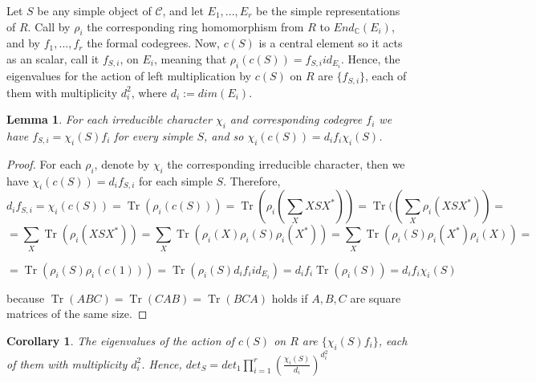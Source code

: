 \documentclass[a4paper,twoside,11pt]{amsart}
\newtheorem{lemma}[theorem]{Lemma}
\newtheorem{corollary}[theorem]{Corollary}
\theoremstyle{plain} %
\theoremstyle{definition}
\begin{document}
Let $S$ be any simple object of $\mathcal{C}$, and let $E_1,...,E_r$ be the simple representations of $R$. Call by $\rho_i$ the corresponding ring homomorphism from $R$ to  $End_{\mathbb{C}}(E_i)$, and by $f_1,...,f_r$ the formal codegrees. Now, $c(S)$ is a central element so it acts as an scalar, call it $f_{S,i}$, on $E_i$, meaning that $\rho_i (c(S))=f_{S,i} id_{E_i}$. Hence, the eigenvalues for the action of left multiplication by $c(S)$ on $R$ are  $\{f_{S,i}\}$, each of them with multiplicity $d_{i}^{2}$, where $d_i:=dim(E_i)$.
\\
\begin{lemma}
    For each irreducible character $\chi_i$ and corresponding codegree $f_i$ we have $f_{S,i}= \chi_i (S) f_i$ for every simple $S$, and so  $\chi_i(c(S))=d_i f_i  \chi_i (S)$.
\end{lemma}
\begin{proof}
    

For each $\rho_i$, denote by $\chi_i$ the corresponding irreducible character, then we have $\chi_i (c(S))=d_i f_{S,i}$ for each simple $S$. Therefore,
\begin{equation}
	d_i f_{S,i}=\chi_i (c(S))=\operatorname{Tr}(\rho_i (c(S)))=\operatorname{Tr}(\rho_i (\sum_X XSX^{*}))=\operatorname{Tr}((\sum_X \rho_i (XSX^{*}))=
\end{equation}
\begin{equation*}
	=\sum_X \operatorname{Tr}(\rho_i (XSX^{*}))=\sum_X \operatorname{Tr}(\rho_i (X)\rho_i(S)\rho_i(X^{*}))=\sum_X \operatorname{Tr}(\rho_i (S)\rho_i(X^{*})\rho_i(X))=
\end{equation*}

\begin{equation*}
	=\operatorname{Tr}(\rho_i (S)\rho_i(c(1)))=\operatorname{Tr}(\rho_i (S)d_i f_i id_{E_i})=d_i f_i \operatorname{Tr}(\rho_i (S))= d_i f_i  \chi_i (S)
\end{equation*}
\medskip

 because $\operatorname{Tr}(ABC)=\operatorname{Tr}(CAB)=\operatorname{Tr}(BCA)$ holds if $A,B,C$ are square matrices of the same size.
 \end{proof}
 
 \medskip 
 
  
 
\begin{corollary}
 	The eigenvalues of the action of $c(S)$ on $R$ are $\{\chi_i (S) f_i\}$, each of them with multiplicity $d_{i}^{2}$. Hence, $det_S=det_1 \prod\limits_{i=1}^{r}
	\left(
	\frac{\chi_i(S)}{d_i}
	\right)^{d_i^2}
	$
\end{corollary}
\bigskip
\end{document}
